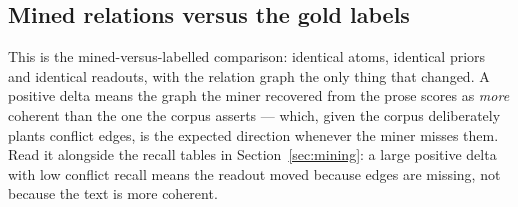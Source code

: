 \documentclass[11pt]{article}
\begin{document}
\subsection{Mined relations versus the gold labels}

This is the mined-versus-labelled comparison: identical atoms, identical priors and identical readouts, with the relation graph the only thing that changed. A positive delta means the graph the miner recovered from the prose scores as \emph{more} coherent than the one the corpus asserts --- which, given the corpus deliberately plants conflict edges, is the expected direction whenever the miner misses them. Read it alongside the recall tables in Section~\ref{sec:mining}: a large positive delta with low conflict recall means the readout moved because edges are missing, not because the text is more coherent.
\end{document}
